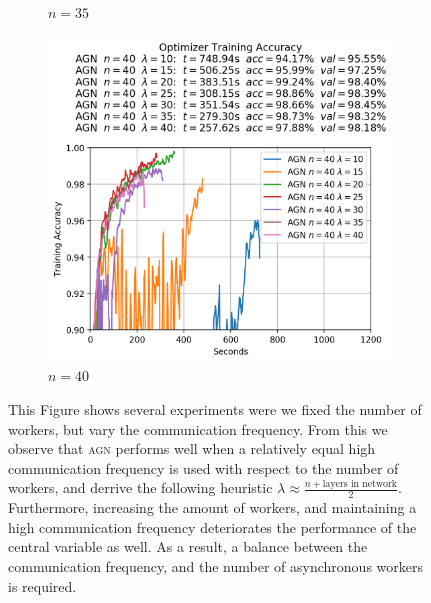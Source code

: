 \begin{figure}
\begin{subfigure}{.3\textwidth}
    \caption{$n = 35$}
  \end{subfigure}
  \begin{subfigure}{.3\textwidth}
    \centering
    \includegraphics[width=\linewidth]{resources/images/agn_experiments_workers_40}
    \caption{$n = 40$}
  \end{subfigure}
  \caption{This Figure shows several experiments were we fixed the number of workers, but vary the communication frequency. From this we observe that \textsc{agn} performs well when a relatively equal high communication frequency is used with respect to the number of workers, and derrive the following heuristic $\lambda \approx \frac{n + \text{layers in network}}{2}$. Furthermore, increasing the amount of workers, and maintaining a high communication frequency deteriorates the performance of the central variable as well. As a result, a balance between the communication frequency, and the number of asynchronous workers is required.}
  \label{fig:agn_experiments_workers}
\end{figure}


